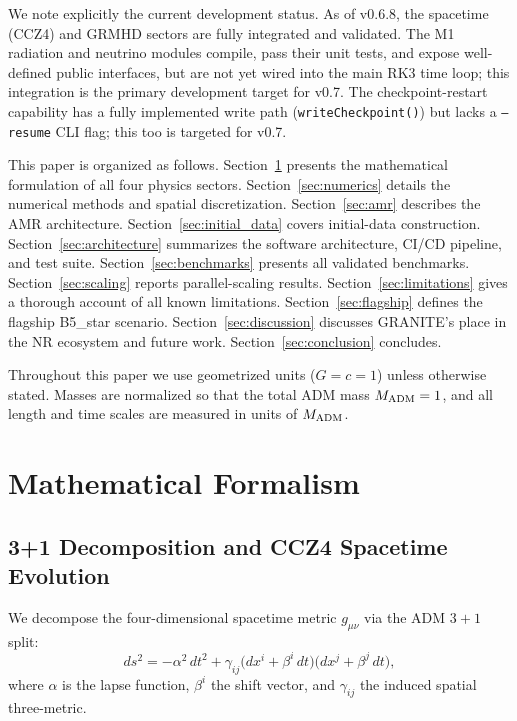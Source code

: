 \documentclass[aps,prd,twocolumn,superscriptaddress,nofootinbib,showpacs,
               longbibliography]{revtex4-2}
\newcommand{\code}[1]{\texttt{#1}}
\begin{document}
We note explicitly the current development status.
As of v0.6.8, the spacetime (CCZ4) and GRMHD sectors are fully integrated
and validated.
The M1 radiation and neutrino modules compile, pass their unit tests, and
expose well-defined public interfaces, but are not yet wired into the main
RK3 time loop; this integration is the primary development target for v0.7.
The checkpoint-restart capability has a fully implemented write path
(\code{writeCheckpoint()}) but lacks a \code{--resume} CLI flag; this too is
targeted for v0.7.

This paper is organized as follows.
Section~\ref{sec:formalism} presents the mathematical formulation of all
four physics sectors.
Section~\ref{sec:numerics} details the numerical methods and spatial
discretization.
Section~\ref{sec:amr} describes the AMR architecture.
Section~\ref{sec:initial_data} covers initial-data construction.
Section~\ref{sec:architecture} summarizes the software architecture, CI/CD
pipeline, and test suite.
Section~\ref{sec:benchmarks} presents all validated benchmarks.
Section~\ref{sec:scaling} reports parallel-scaling results.
Section~\ref{sec:limitations} gives a thorough account of all known
limitations.
Section~\ref{sec:flagship} defines the flagship B5\_star scenario.
Section~\ref{sec:discussion} discusses GRANITE's place in the NR ecosystem
and future work.
Section~\ref{sec:conclusion} concludes.

Throughout this paper we use geometrized units ($G = c = 1$) unless
otherwise stated.
Masses are normalized so that the total ADM mass $M_{\rm ADM} = 1$,
and all length and time scales are measured in units of $M_{\rm ADM}$.

\section{Mathematical Formalism}
\label{sec:formalism}

\subsection{3+1 Decomposition and CCZ4 Spacetime Evolution}
\label{sec:ccz4_formalism}

We decompose the four-dimensional spacetime metric $g_{\mu\nu}$ via the
ADM $3+1$ split:
\begin{equation}
  ds^2 = -\alpha^2\,dt^2
       + \gamma_{ij}\bigl(dx^i + \beta^i\,dt\bigr)
                    \bigl(dx^j + \beta^j\,dt\bigr),
  \label{eq:adm}
\end{equation}
where $\alpha$ is the lapse function, $\beta^i$ the shift vector, and
$\gamma_{ij}$ the induced spatial three-metric.
\end{document}

